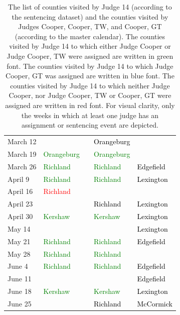 \documentclass[11pt, oneside]{article}   	%
\theoremstyle{ModifiedStyle}
\begin{document}
\begin{table}[H]
{\begin{tabular}{L{23mm}C{55mm}C{38mm}C{38mm}C{38mm}}
    			\rule{0pt}{2.3ex} March 12 & & & \textcolor{black}{Orangeburg} &\\
    			\rule{0pt}{2.3ex} March 19 &  \textcolor{green}{Orangeburg} & & \textcolor{green}{Orangeburg} &\\
    			\rule{0pt}{2.3ex} March 26 &  \textcolor{green}{Richland} & & \textcolor{green}{Richland} &  \textcolor{black}{Edgefield}\\
    			\rule{0pt}{2.3ex} April 9 &  \textcolor{green}{Richland} & & \textcolor{green}{Richland} &  \textcolor{black}{Lexington}\\
    			\rule{0pt}{2.3ex} April 16 &  \textcolor{red}{Richland} & & &\\
    			\rule{0pt}{2.3ex} April 23 & & & \textcolor{black}{Richland} &  \textcolor{black}{Lexington}\\
    			\rule{0pt}{2.3ex} April 30 &  \textcolor{green}{Kershaw} & & \textcolor{green}{Kershaw} &  \textcolor{black}{Lexington}\\
    			\rule{0pt}{2.3ex} May 14 & & & &  \textcolor{black}{Lexington}\\\rule{0pt}{2.3ex} May 21 &  \textcolor{green}{Richland} & & \textcolor{green}{Richland} &  \textcolor{black}{Edgefield}\\
    			\rule{0pt}{2.3ex} May 28 &  \textcolor{green}{Richland} & & \textcolor{green}{Richland} &\\
    			\rule{0pt}{2.3ex} June 4 &  \textcolor{green}{Richland} & & \textcolor{green}{Richland} &  \textcolor{black}{Edgefield}\\
    			\rule{0pt}{2.3ex} June 11 & & & &  \textcolor{black}{Edgefield}\\\rule{0pt}{2.3ex} June 18 &  \textcolor{green}{Kershaw} & & \textcolor{green}{Kershaw} &  \textcolor{black}{Lexington}\\
    			\rule{0pt}{2.3ex} June 25 & & & \textcolor{black}{Richland} &  \textcolor{black}{McCormick}\\
    			\hline
    		\end{tabular}
    	}
    	\vspace{-1mm}
    	\caption{The list of counties visited by Judge 14 (according to the sentencing dataset) and the counties visited by Judges Cooper, Cooper, TW, and Cooper, GT (according to the master calendar). The counties visited by Judge 14 to which either Judge Cooper or Judge Cooper, TW were assigned are written in green font. The counties visited by Judge 14 to which Judge Cooper, GT was assigned are written in blue font. The counties visited by Judge 14 to which neither Judge Cooper, nor Judge Cooper, TW or Cooper, GT were assigned are written in red font. For visual clarity, only the weeks in which at least one judge has an assignment or sentencing event are depicted.}
    	\label{Table_Coopers_Schedules}
    	\vspace{-2mm}
    \end{table}
\end{document}
